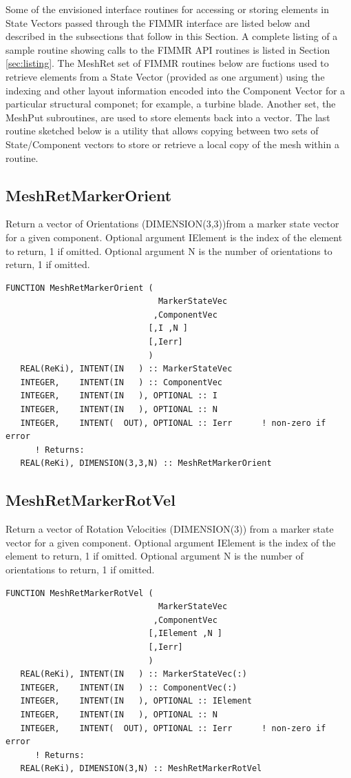 \documentclass[11pt]{article}
\begin{document}
Some of the envisioned interface routines for accessing or storing elements in State Vectors passed through
the FIMMR interface are listed below and described in the subsections that follow in this Section.
A complete listing of a sample routine showing calls to the FIMMR API routines is listed
in Section \ref{sec:listing}.
The MeshRet set of FIMMR routines below are fuctions used to retrieve elements 
from a State Vector (provided as one argument) 
using the indexing and other layout information encoded into the Component Vector for a particular 
structural componet; for example, a turbine blade.  Another set, the MeshPut subroutines, are
used to store elements back into a vector.  The last routine sketched below is a utility that allows 
copying between two sets of State/Component vectors to store or retrieve a local copy of the mesh
within a routine.


\subsection{MeshRetMarkerOrient}
Return a vector of Orientations (DIMENSION(3,3))from a marker state vector for a given component.
Optional argument IElement is the index of the element to return, 1 if omitted.
Optional argument N is the number of orientations to return, 1 if omitted.
\begin{verbatim}
FUNCTION MeshRetMarkerOrient ( 
                               MarkerStateVec
                              ,ComponentVec 
                             [,I ,N ]
                             [,Ierr]
                             )
   REAL(ReKi), INTENT(IN   ) :: MarkerStateVec
   INTEGER,    INTENT(IN   ) :: ComponentVec
   INTEGER,    INTENT(IN   ), OPTIONAL :: I
   INTEGER,    INTENT(IN   ), OPTIONAL :: N
   INTEGER,    INTENT(  OUT), OPTIONAL :: Ierr 		! non-zero if error
      ! Returns:
   REAL(ReKi), DIMENSION(3,3,N) :: MeshRetMarkerOrient
\end{verbatim}

\subsection{MeshRetMarkerRotVel}
Return a vector of Rotation Velocities (DIMENSION(3)) from a marker state vector for a given component.
Optional argument IElement is the index of the element to return, 1 if omitted.
Optional argument N is the number of orientations to return, 1 if omitted.
\begin{verbatim}
FUNCTION MeshRetMarkerRotVel ( 
                               MarkerStateVec
                              ,ComponentVec 
                             [,IElement ,N ]
                             [,Ierr]
                             )
   REAL(ReKi), INTENT(IN   ) :: MarkerStateVec(:)
   INTEGER,    INTENT(IN   ) :: ComponentVec(:)
   INTEGER,    INTENT(IN   ), OPTIONAL :: IElement
   INTEGER,    INTENT(IN   ), OPTIONAL :: N
   INTEGER,    INTENT(  OUT), OPTIONAL :: Ierr 		! non-zero if error
      ! Returns:
   REAL(ReKi), DIMENSION(3,N) :: MeshRetMarkerRotVel
\end{verbatim}
\end{document}
